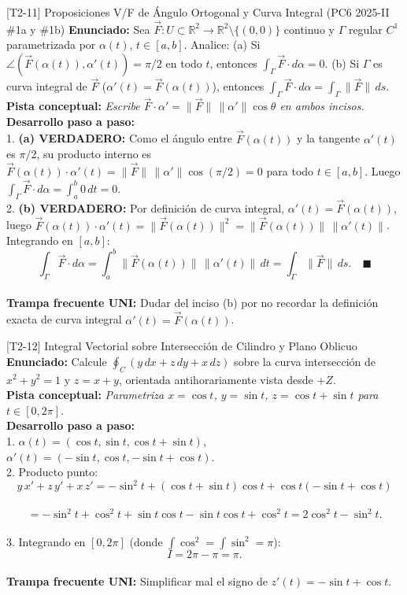 \documentclass[11pt,a4paper]{article}
\begin{document}
\begin{ejerciciobox}{[T2-11] Proposiciones V/F de Ángulo Ortogonal y Curva Integral (PC6 2025-II \#1a y \#1b)}
\textbf{Enunciado:} Sea $\vec{F}: U \subset \mathbb{R}^2 \to \mathbb{R}^2 \setminus \{(0,0)\}$ continuo y $\Gamma$ regular $C^1$ parametrizada por $\alpha(t)$, $t\in[a,b]$. Analice: (a) Si $\angle(\vec{F}(\alpha(t)), \alpha'(t)) = \pi/2$ en todo $t$, entonces $\int_\Gamma \vec{F}\cdot d\alpha = 0$. (b) Si $\Gamma$ es curva integral de $\vec{F}$ ($\alpha'(t) = \vec{F}(\alpha(t))$), entonces $\int_\Gamma \vec{F}\cdot d\alpha = \int_\Gamma \|\vec{F}\|\,ds$.\\[0.2cm]
\textbf{Pista conceptual:} \emph{Escribe $\vec{F}\cdot\alpha' = \|\vec{F}\|\,\|\alpha'\|\cos\theta$ en ambos incisos.}\\[0.2cm]
\textbf{Desarrollo paso a paso:}\\
1. \textbf{(a) VERDADERO:} Como el ángulo entre $\vec{F}(\alpha(t))$ y la tangente $\alpha'(t)$ es $\pi/2$, su producto interno es $\vec{F}(\alpha(t))\cdot\alpha'(t) = \|\vec{F}\|\,\|\alpha'\|\cos(\pi/2) = 0$ para todo $t \in [a,b]$. Luego $\int_\Gamma \vec{F}\cdot d\alpha = \int_a^b 0\,dt = 0$.\\
2. \textbf{(b) VERDADERO:} Por definición de curva integral, $\alpha'(t) = \vec{F}(\alpha(t))$, luego $\vec{F}(\alpha(t))\cdot\alpha'(t) = \|\vec{F}(\alpha(t))\|^2 = \|\vec{F}(\alpha(t))\|\,\|\alpha'(t)\|$. Integrando en $[a,b]$:\\
$$\int_\Gamma \vec{F}\cdot d\alpha = \int_a^b \|\vec{F}(\alpha(t))\|\,\|\alpha'(t)\|\,dt = \int_\Gamma \|\vec{F}\|\,ds. \quad \blacksquare$$\\[0.2cm]
\textbf{Trampa frecuente UNI:} Dudar del inciso (b) por no recordar la definición exacta de curva integral $\alpha'(t) = \vec{F}(\alpha(t))$.
\end{ejerciciobox}

\begin{ejerciciobox}{[T2-12] Integral Vectorial sobre Intersección de Cilindro y Plano Oblicuo}
\textbf{Enunciado:} Calcule $\oint_C (y\,dx + z\,dy + x\,dz)$ sobre la curva intersección de $x^2 + y^2 = 1$ y $z = x + y$, orientada antihorariamente vista desde $+Z$.\\[0.2cm]
\textbf{Pista conceptual:} \emph{Parametriza $x = \cos t$, $y = \sin t$, $z = \cos t + \sin t$ para $t \in [0, 2\pi]$.}\\[0.2cm]
\textbf{Desarrollo paso a paso:}\\
1. $\alpha(t) = (\cos t, \sin t, \cos t + \sin t)$, $\alpha'(t) = (-\sin t, \cos t, -\sin t + \cos t)$.\\
2. Producto punto:\\
$$y\,x' + z\,y' + x\,z' = -\sin^2 t + (\cos t + \sin t)\cos t + \cos t(-\sin t + \cos t)$$\\
$$= -\sin^2 t + \cos^2 t + \sin t\cos t - \sin t\cos t + \cos^2 t = 2\cos^2 t - \sin^2 t.$$\\
3. Integrando en $[0, 2\pi]$ (donde $\int \cos^2 = \int \sin^2 = \pi$):\\
$$I = 2\pi - \pi = \pi.$$\\[0.2cm]
\textbf{Trampa frecuente UNI:} Simplificar mal el signo de $z'(t) = -\sin t + \cos t$.
\end{ejerciciobox}
\end{document}
